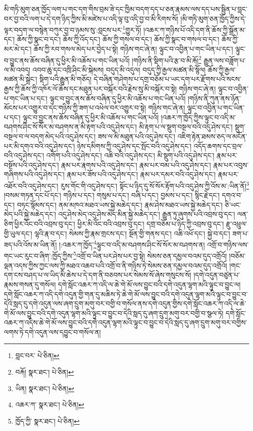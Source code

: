 མི་གཏི་མུག་ཅན་ཁྱོད་ལག་པ་གང་དག་གིས་བྲམ་ཟེ་དང་ཁྱིམ་བདག་དད་པ་ཅན་རྣམས་ལས་དད་པས་སྦྱིན་པ་བླང་བར་བྱ་བའི་ལག་པ་དེ་དག་ཉིད་ཀྱིས་མི་མཛེས་པ་འདི་ལྟ་བུ་འདི་བྱ་བ་མི་རིགས་སོ། །མི་གཏི་མུག་ཅན་ཁྱོད་ཀྱིས་དེ་ལྟར་བདག་ལ་བསྙེན་བཀུར་བྱ་བ་ཉམས་སུ་:བླངས་པར་\footnote{བླང་བར་  པེ་ཅིན། }གྱུར་ཏོ། །འཆར་ཀ་གཉིས་པོ་འདི་དག་ནི་ཆོས་ཀྱི་སྒྲོན་མ་དང་། ཆོས་ཀྱི་སྣང་བ་དང་། ཆོས་ཀྱི་འོད་དང་། ཆོས་ཀྱི་གསལ་བ་དང་། ཆོས་ཀྱི་སྣང་བ་གསལ་བ་དང་། ཆོས་ཀྱི་མར་མེ་དང་། ཆོས་ཀྱི་རབ་གསལ་མེད་པར་བྱེད་པ་སྟེ། གཉིས་གང་ཞེ་ན། ལྟུང་བ་འབྱིན་པ་གང་ཡིན་པ་དང་། ལྟུང་བ་བྱུང་ནས་ཆོས་བཞིན་དུ་ཕྱིར་མི་འཆོས་པ་གང་ཡིན་པའོ། །གཉིས་ནི་སྡིག་པའི་རྩ་བ་མི་རྐོ།\footnote{བརྐོ།  སྣར་ཐང་།  པེ་ཅིན། } རྒྱུན་ལས་བཟློག་པ་ལ་མི་འབད། འབབ་ཆུ་དང་འཁྲི་ཤིང་མི་སྐེམས། བདུད་མི་འདུལ། བདུད་ཀྱི་རྒྱལ་མཚན་མི་སྙོལ། ཆོས་ཀྱི་རྒྱལ་མཚན་མི་སྒྲེང་། སྡིག་པའི་རྒྱུན་མི་གཅོད། དེ་བཞིན་གཤེགས་པ་དགྲ་བཅོམ་པ་ཡང་དག་པར་རྫོགས་པའི་སངས་རྒྱས་ཀྱི་ཆོས་ཀྱི་འཁོར་ལོ་ཆོས་དང་མཐུན་པར་བསྐོར་བའི་རྗེས་སུ་མི་བསྐོར་བ་སྟེ། གཉིས་གང་ཞེ་ན། ལྟུང་བ་འབྱིན་པ་གང་ཡིན་པ་དང་། ལྟུང་བ་བྱུང་ནས་ཆོས་བཞིན་དུ་ཕྱིར་མི་འཆོས་པ་གང་ཡིན་པའོ། །གཉིས་ནི་ཀུན་ནས་ཉོན་མོངས་པར་འགྱུར་བ་དང་གཉིས་ཀྱི་ཟག་པ་འཕེལ་བར་འགྱུར་བ་སྟེ། གཉིས་གང་ཞེ་ན། ལྟུང་བ་འབྱིན་པ་གང་ཡིན་པ་དང་། ལྟུང་བ་བྱུང་ནས་ཆོས་བཞིན་དུ་ཕྱིར་མི་འཆོས་པ་གང་ཡིན་པའོ། །འཆར་ཀ་ཁྱོད་ཀྱིས་ལྟུང་བ་འདི་མ་བཤགས་ཤིང་སོ་སོར་མ་བཤགས་ན་མི་རྟག་པའི་འདུ་ཤེས་དང་། མི་རྟག་པ་ལ་སྡུག་བསྔལ་བའི་འདུ་ཤེས་དང་། སྡུག་བསྔལ་བ་ལ་བདག་མེད་པའི་འདུ་ཤེས་དང་། ཟས་ལ་མི་མཐུན་པའི་འདུ་ཤེས་དང་། འཇིག་རྟེན་ཐམས་ཅད་ལ་མངོན་པར་མི་དགའ་བའི་འདུ་ཤེས་དང་། ཉེས་དམིགས་ཀྱི་འདུ་ཤེས་དང་སྤོང་བའི་འདུ་ཤེས་དང་། འདོད་ཆགས་དང་བྲལ་བའི་འདུ་ཤེས་དང་། འགོག་པའི་འདུ་ཤེས་དང་། འཆི་བའི་འདུ་ཤེས་དང་། མི་སྡུག་པའི་འདུ་ཤེས་དང་། རྣམ་པར་བསྔོས་པའི་འདུ་ཤེས་དང་། རྣམ་པར་རྣགས་པའི་འདུ་ཤེས་དང་། རྣམ་པར་བམ་པའི་འདུ་ཤེས་དང་། རྣམ་པར་འབུས་གཞིགས་པའི་འདུ་ཤེས་དང་། རྣམ་པར་ཟོས་པའི་འདུ་ཤེས་དང་། རྣམ་པར་དམར་བའི་འདུ་ཤེས་དང་། རྣམ་པར་འཐོར་བའི་འདུ་ཤེས་དང་། རུས་གོང་གི་འདུ་ཤེས་དང་། སྟོང་པ་ཉིད་དུ་སོ་སོར་རྟོག་པའི་འདུ་ཤེས་ཀྱི་འོས་མ་:ཡིན་ནོ།\footnote{ཡིན།  སྣར་ཐང་།  པེ་ཅིན། } །བསམ་གཏན་དང་པོ་དང་། གཉིས་པ་དང་། གསུམ་པ་དང་། བཞི་པ་དང་། བྱམས་པ་དང་། སྙིང་རྗེ་དང་། དགའ་བ་དང་། བཏང་སྙོམས་དང་། ནམ་མཁའ་མཐའ་ཡས་སྐྱེ་མཆེད་དང་། རྣམ་ཤེས་མཐའ་ཡས་སྐྱེ་མཆེད་དང་། ཅི་ཡང་མེད་པའི་སྐྱེ་མཆེད་དང་། འདུ་ཤེས་མེད་འདུ་ཤེས་མེད་མིན་སྐྱེ་མཆེད་དང་། རྒྱུན་ཏུ་ཞུགས་པའི་འབྲས་བུ་དང་། ལན་ཅིག་ཕྱིར་འོང་བའི་འབྲས་བུ་དང་། ཕྱིར་མི་འོང་བའི་འབྲས་བུ་དང་། དགྲ་བཅོམ་པ་ཉིད་ཀྱི་འབྲས་བུ་དང་། རྫུ་འཕྲུལ་གྱི་ཡུལ་དང་། ལྷའི་རྣ་བ་དང་། སེམས་ཀྱི་རྣམ་གྲངས་དང་། སྔོན་གྱི་གནས་དང་། འཆི་འཕོ་དང་། སྐྱེ་བ་དང་། ཟག་པ་ཟད་པའི་འོས་མ་ཡིན་ནོ། །:འཆར་ཀ་ཁྱོད་\footnote{འཆར་ཀ་  སྣར་ཐང་།  པེ་ཅིན། }ལྟུང་བ་འདི་མ་བཤགས་ཤིང་སོ་སོར་མ་བཤགས་ན། འགྲོ་བ་གཉིས་ལས་གང་ཡང་རུང་བ་ཞིག་:ཁྱོད་ཀྱིས་\footnote{ཁྱོད་ཀྱི་  སྣར་ཐང་།  པེ་ཅིན། }འགྲོ་བ་ཡིན་པར་ཤེས་པར་བྱ་སྟེ། སེམས་ཅན་དམྱལ་བའམ་དུད་འགྲོའོ། །བཅོམ་ལྡན་འདས་ཀྱིས་ཀྱང་ལས་ཀྱི་མཐའ་འཆབ་པའི་འགྲོ་བ་ནི་གཉིས་ཏེ་སེམས་ཅན་དམྱལ་བའམ་དུད་འགྲོའོ། །གང་དག་ངས་བཤད་པ་ལ་ཡིད་མི་ཆེས་པ་དེ་དག་ནི་བཅབས་པར་སེམས་སོ་ཞེས་གསུངས་སོ། །དགེ་འདུན་བཙུན་པ་རྣམས་གསན་དུ་གསོལ། དགེ་སློང་འཆར་ཀ་འདི་ལ་ཆེ་གེ་མོ་ལས་བྱུང་བའི་དགེ་འདུན་ལྷག་མའི་ལྟུང་བ་བྱུང་ལ། དགེ་སློང་འཆར་ཀ་འདི་དགེ་འདུན་གྱི་གན་དུ་མཆིས་ཏེ་ཆེ་གེ་མོ་ལས་བྱུང་བའི་དགེ་འདུན་ལྷག་མའི་ལྟུང་བ་བྱུང་བ་དེའི་སླད་དུ་དགེ་འདུན་ལས་ཞག་དྲུག་མགུ་བར་བགྱི་བ་གསོལ་ནས་དགེ་འདུན་གྱིས་དགེ་སློང་འཆར་ཀ་འདི་ལ་ཆེ་གེ་མོ་ལས་བྱུང་བའི་དགེ་འདུན་ལྷག་མའི་ལྟུང་བ་བྱུང་བ་དེའི་སླད་དུ་ཞག་དྲུག་མགུ་བར་བགྱི་བ་སྩལ་ཏེ། དགེ་སློང་འཆར་ཀ་འདིས་ཆེ་གེ་མོ་ལས་བྱུང་བའི་དགེ་འདུན་ལྷག་མའི་ལྟུང་བ་བྱུང་བ་དེའི་སླད་དུ་ཞག་དྲུག་མགུ་བར་བགྱིས་ལགས་ཏེ་དགེ་འདུན་ལས་དབྱུང་བ་གསོལ་ན། 
